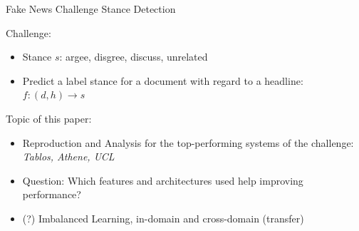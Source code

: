 \documentclass[english,handout]{mlutalk}
\begin{document}
\begin{frame}{Fake News Challenge Stance Detection~\cite{HanselowskiSSCC2018}}
  \begin{example}
  \end{example}
  Challenge: %
  \begin{itemize}
      \item Stance $s$: argee, disgree, discuss, unrelated
      \item Predict a label stance for a document with regard to a headline: $f: (d,h) \rightarrow s$
  \end{itemize}
  Topic of this paper:
  \begin{itemize}
    \item Reproduction and Analysis for the top-performing systems of the challenge: \textit{Tablos, Athene, UCL}
    \item Question: Which features and architectures used help improving performance?
    \item (?) Imbalanced Learning, in-domain and cross-domain (transfer)
  \end{itemize}
\end{frame}
\end{document}

